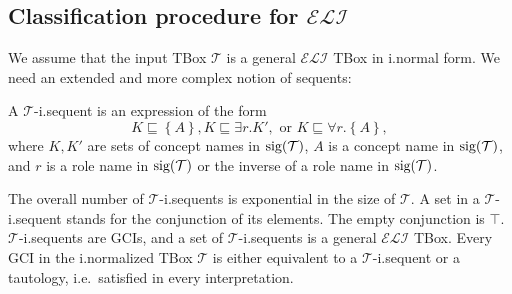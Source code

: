 \subsection{Classification procedure for $\mathcal{ELI}$}
We assume that the input TBox $\mathcal{T}$ is a general $\mathcal{ELI}$ TBox in i.normal form.
We need an extended and more complex notion of sequents:
\begin{definition}
	A $\mathcal{T}$-i.sequent is an expression of the form
	\[
		K \sqsubseteq \left\{ A \right\}, K \sqsubseteq \exists r.K', \text{ or } K \sqsubseteq \forall r.\left\{ A \right\}
	,\]
	where $K, K'$ are sets of concept names in $\operatorname{\text{sig}}(\mathcal{T})$,
	$A$ is a concept name in $\operatorname{\text{sig}}(\mathcal{T})$,
	and $r $ is a role name in $\operatorname{\text{sig}}(\mathcal{T})$ or the inverse of a role name in $\operatorname{\text{sig}}(\mathcal{T})$.
\end{definition}
\begin{note}
	The overall number of $\mathcal{T}$-i.sequents is exponential in the size of $\mathcal{T}$.
	A set in a  $\mathcal{T}$-i.sequent stands for the conjunction of its elements.
	The empty conjunction is $\top$.
	$\mathcal{T}$-i.sequents are GCIs, and a set of $\mathcal{T}$-i.sequents is a general $\mathcal{ELI}$ TBox.
	Every GCI in the i.normalized TBox $\mathcal{T}$ is either equivalent to a $\mathcal{T}$-i.sequent
	or a tautology, i.e.\ satisfied in every interpretation.
\end{note}
